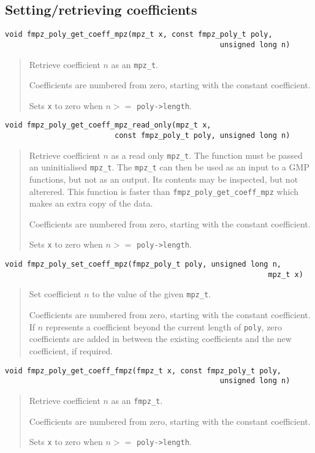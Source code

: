 \documentclass[a4paper,10pt]{article}
\newcommand{\code}{\lstinline}
\begin{document}
\subsection{Setting/retrieving coefficients}

\begin{lstlisting}
void fmpz_poly_get_coeff_mpz(mpz_t x, const fmpz_poly_t poly, 
                                                 unsigned long n)
\end{lstlisting}
\begin{quote}
Retrieve coefficient $n$ as an \code{mpz_t}. 

Coefficients are numbered from zero, starting with the constant coefficient.

Sets \code{x} to zero when $n >= $ \code{poly->length}. 
\end{quote}

\begin{lstlisting}
void fmpz_poly_get_coeff_mpz_read_only(mpz_t x, 
                         const fmpz_poly_t poly, unsigned long n)
\end{lstlisting}
\begin{quote}
Retrieve coefficient $n$ as a read only \code{mpz_t}. The function must be passed an uninitialised \code{mpz_t}. The \code{mpz_t} can then be used as an input to a GMP functions, but not as an output. Its contents may be inspected, but not alterered. This function is faster than \code{fmpz_poly_get_coeff_mpz} which makes an extra copy of the data. 

Coefficients are numbered from zero, starting with the constant coefficient.

Sets \code{x} to zero when $n >= $ \code{poly->length}. 
\end{quote}

\begin{lstlisting}
void fmpz_poly_set_coeff_mpz(fmpz_poly_t poly, unsigned long n, 
                                                            mpz_t x) 
\end{lstlisting}
\begin{quote}
Set coefficient $n$ to the value of the given \code{mpz_t}. 

Coefficients are numbered from zero, starting with the constant coefficient. If $n$ represents a coefficient beyond the current length of \code{poly}, zero coefficients are added in between the existing coefficients and the new coefficient, if required.
\end{quote}

\begin{lstlisting}
void fmpz_poly_get_coeff_fmpz(fmpz_t x, const fmpz_poly_t poly, 
                                                 unsigned long n)
\end{lstlisting}
\begin{quote}
Retrieve coefficient $n$ as an \code{fmpz_t}. 

Coefficients are numbered from zero, starting with the constant coefficient.

Sets \code{x} to zero when $n >= $ \code{poly->length}. 
\end{quote}
\end{document}
